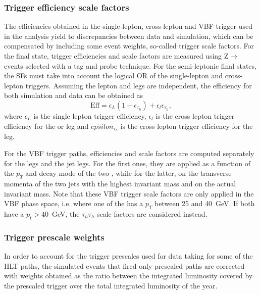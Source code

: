 \documentclass[../main.tex]{subfiles}
\begin{document}
\subsubsection*{Trigger efficiency scale factors}
\label{hh:sec:trigger_sf}

The efficiencies obtained in the single-lepton, cross-lepton and VBF trigger used in the analysis yield to discrepancies between data and simulation, which can be compensated by including some event weights, so-called trigger scale factors. For the \tauh\tauh{} final state, trigger efficiencies and scale factors are measured using Z$\to$\taumu\tauh{} events selected with a tag and probe technique. For the semi-leptonic final states, the SFs must take into account the logical OR of the single-lepton and cross-lepton triggers. Assuming the lepton and \tauh{} legs are independent, the efficiency for both simulation and data can be obtained as
\begin{equation}
\text{Eff} = \epsilon_L(1-\epsilon_{\tau_h}) +  \epsilon_l\epsilon_{\tau_h},
\end{equation}
where $\epsilon_L$ is the single lepton trigger efficiency, $\epsilon_l$ is the cross lepton trigger efficiency for the \taue{} or \taumu{} leg and $epsilon_{\tau_h}$ is the cross lepton trigger efficiency for the \tauh{} leg.

For the VBF trigger paths, efficiencies and scale factors are computed separately for the \tauh{} legs and the jet legs. For the first ones, they are applied as a function of the $p_T$ and decay mode of the two \tauh{}, while for the latter, on the transverse momenta of the two jets with the highest invariant mass and on the actual invariant mass. Note that these VBF trigger scale factors are only applied in the VBF phase space, i.e. where one of the \tauh{} has a $p_T$ between 25 and 40~GeV. If both \tauh{} have a $p_t>40$~GeV, the $\tau_h\tau_h$ scale factors are considered instead.



\subsubsection*{Trigger prescale weights}
\label{hh:sec:prescale_sf}

In order to account for the trigger prescales used for data taking for some of the HLT paths, the simulated events that fired only prescaled paths are corrected with weights obtained as the ratio between the integrated luminosity covered by the prescaled trigger over the total integrated luminosity of the year. 
\end{document}
